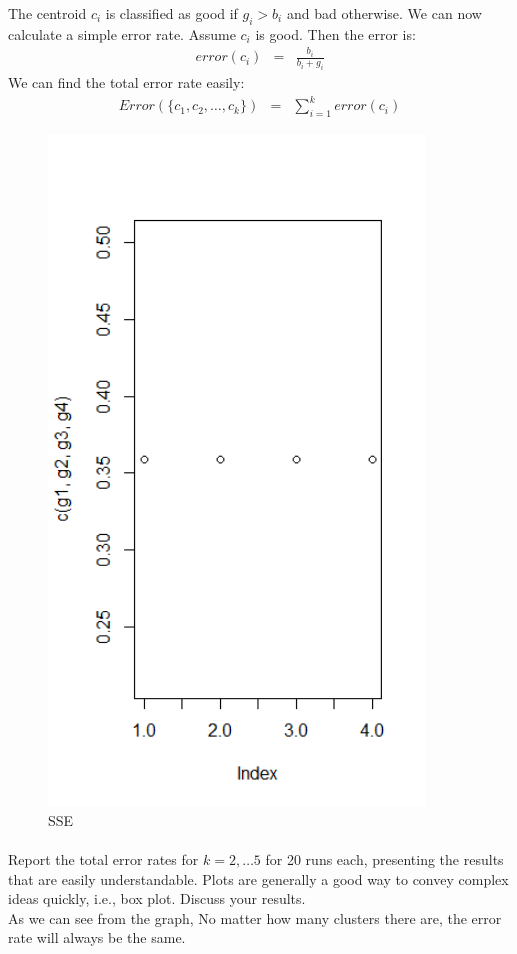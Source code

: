 \documentclass{article}
\begin{document}
  The centroid $c_i$ is classified as good if $g_i > b_i$ and bad otherwise.  We can now calculate a simple error rate.    Assume $c_i$ is good.  Then the error is:
 \begin{eqnarray*}
 error(c_i) &=& \frac{b_i}{b_i + g_i}
 \end{eqnarray*}
 We can find the total error rate easily:
 \begin{eqnarray*}
 Error(\{c_1, c_2, \ldots, c_k\}) &=& \sum_{i=1}^k error(c_i)
 \end{eqnarray*}
\begin{figure}
  \includegraphics[width=100mm, scale = 0.5]{error.png}
  \caption{SSE}
\end{figure}
\paragraph{}
Report the total error rates for $k = 2,\ldots 5$ for 20 runs each, presenting the results that are easily understandable.  Plots are generally a good way to convey complex ideas quickly, i.e., box plot.  Discuss  your results.\\
As we can see from the graph, No matter how many clusters there are, the error rate will always be the same.\\
\end{document}
